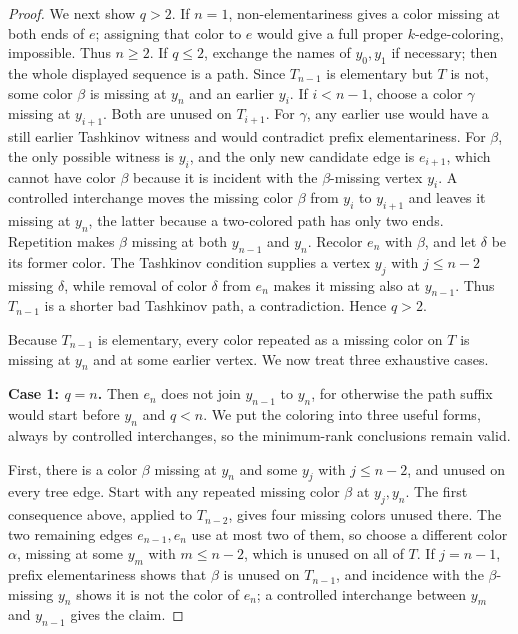 \begin{proof}
We next show $q>2$.  If $n=1$, non-elementariness gives a color missing at
both ends of $e$; assigning that color to $e$ would give a full proper
$k$-edge-coloring, impossible.  Thus $n\geq2$.  If $q\leq2$, exchange the
names of $y_0,y_1$ if necessary; then the whole displayed sequence is a
path.  Since $T_{n-1}$ is elementary but $T$ is not, some color $\beta$ is
missing at $y_n$ and an earlier $y_i$.  If $i<n-1$, choose a color
$\gamma$ missing at $y_{i+1}$.  Both are unused on $T_{i+1}$.  For
$\gamma$, any earlier use would have a still earlier Tashkinov witness and
would contradict prefix elementariness.  For $\beta$, the only possible
witness is $y_i$, and the only new candidate edge is $e_{i+1}$, which cannot
have color $\beta$ because it is incident with the $\beta$-missing vertex
$y_i$.  A controlled interchange moves the missing color $\beta$ from
$y_i$ to $y_{i+1}$ and leaves it missing at $y_n$, the latter because a
two-colored path has only two ends.  Repetition makes $\beta$ missing at
both $y_{n-1}$ and $y_n$.  Recolor $e_n$ with $\beta$, and let $\delta$ be
its former color.  The Tashkinov condition supplies a vertex $y_j$ with
$j\leq n-2$ missing $\delta$, while removal of color $\delta$ from $e_n$
makes it missing also at $y_{n-1}$.  Thus $T_{n-1}$ is a shorter bad
Tashkinov path, a contradiction.  Hence $q>2$.

Because $T_{n-1}$ is elementary, every color repeated as a missing color on
$T$ is missing at $y_n$ and at some earlier vertex.  We now treat three
exhaustive cases.

\textbf{Case 1: $q=n$.}
Then $e_n$ does not join $y_{n-1}$ to $y_n$, for otherwise the path suffix
would start before $y_n$ and $q<n$.  We put the coloring into three useful
forms, always by controlled interchanges, so the minimum-rank conclusions
remain valid.

First, there is a color $\beta$ missing at $y_n$ and some $y_j$ with
$j\leq n-2$, and unused on every tree edge.  Start with any repeated missing
color $\beta$ at $y_j,y_n$.  The first consequence above, applied to
$T_{n-2}$, gives four missing colors unused there.  The two remaining edges
$e_{n-1},e_n$ use at most two of them, so choose a different color
$\alpha$, missing at some $y_m$ with $m\leq n-2$, which is unused on all of
$T$.  If $j=n-1$, prefix elementariness shows that $\beta$ is unused on
$T_{n-1}$, and incidence with the $\beta$-missing $y_n$ shows it is not the
color of $e_n$; a controlled interchange between $y_m$ and $y_{n-1}$ gives
the claim.


\end{proof}
